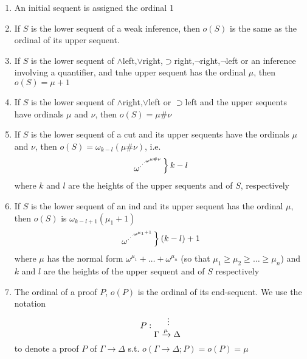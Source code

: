 \documentclass[11pt]{article}
\begin{document}
\begin{enumerate}
\item An initial sequent is assigned the ordinal 1
\item If \(S\) is the lower sequent of a weak inference, then \(o(S)\) is the same as the ordinal of
its upper sequent.
\item If \(S\) is the lower sequent
of \(\wedge\)left,\(\vee\)right,\(\supset\)right,\(\neg\)right,\(\neg\)left or an inference
involving a quantifier, and tnhe upper sequent has the ordinal \(\mu\), then \(o(S)=\mu+1\)
\item If \(S\) is the lower sequent of \(\wedge\)right,\(\vee\)left or \(\supset\)left and the upper
sequents have ordinals \(\mu\) and \(\nu\), then \(o(S)=\mu\#\nu\)
\item If \(S\) is the lower sequent of a cut and its upper sequents have the ordinals \(\mu\) and \(\nu\),
then \(o(S)=\omega_{k-l}(\mu\#\nu)\), i.e.
  \begin{equation*}
\begin{rcases}
\omega^{\cdot^{\cdot^{\cdot^{\omega^{\mu\#\nu}}}}}
\end{rcases}k-l
  \end{equation*}
where \(k\) and \(l\) are the heights of the upper sequents and of \(S\), respectively
\item If \(S\) is the lower sequent of an ind and its upper sequent has the ordinal \(\mu\), then \(o(S)\)
is \(\omega_{k-l+1}(\mu_1+1)\)
  \begin{equation*}
\begin{rcases}
\omega^{\cdot^{\cdot^{\cdot^{\omega^{\mu_1+1}}}}}
\end{rcases}(k-l)+1
  \end{equation*}
where \(\mu\) has the normal form \(\omega^{\mu_1}+\dots+\omega^{\mu_n}\) (so
that \(\mu_1\ge\mu_2\ge\dots\ge\mu_n\)) and \(k\) and \(l\) are the heights of the upper
sequent and of \(S\) respectively
\item The ordinal of a proof \(P\), \(o(P)\) is the ordinal of its end-sequent. We use the notation
  \begin{equation*}
P:
\begin{prooftree}%
\hypo{}
\ellipsis{}{\Gamma\xrightarrow{\mu}\Delta}
\end{prooftree}
  \end{equation*}
to denote a proof \(P\) of \(\Gamma\to\Delta\) s.t. \(o(\Gamma\to\Delta;P)=o(P)=\mu\)


\end{enumerate}
\end{document}

